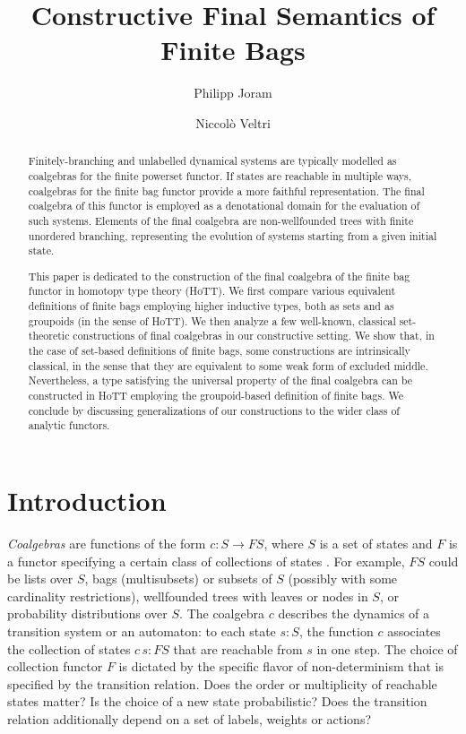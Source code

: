 \documentclass[final,a4paper,USenglish,cleveref]{lipics-v2021}
\title{Constructive Final Semantics of Finite Bags}
\author{Philipp Joram}%
  {Department of Software Science, Tallinn University of Technology, Estonia}
  {philipp@cs.ioc.ee}%
  {https://orcid.org/0000-0002-0448-7907}%
  {}
\author{Niccol{\`o} Veltri}%
  {Department of Software Science, Tallinn University of Technology, Estonia}
  {niccolo@cs.ioc.ee}%
  {https://orcid.org/0000-0002-7230-3436}%
  {}
\begin{document}
\maketitle

\begin{abstract}
  Finitely-branching and unlabelled dynamical systems are typically modelled as coalgebras for the finite powerset functor.
  If states are reachable in multiple ways, coalgebras for the finite bag functor provide a more faithful representation.
  The final coalgebra of this functor is employed as a denotational domain for the evaluation of such systems.
  Elements of the final coalgebra are non-wellfounded trees with finite unordered branching,
  representing the evolution of systems starting from a given initial state.

  This paper is dedicated to the construction of the final coalgebra of the finite bag functor in homotopy type theory (HoTT).
  We first compare various equivalent definitions of finite bags employing higher inductive types, both as sets and as groupoids (in the sense of HoTT).
  We then analyze a few well-known, classical set-theoretic constructions of final coalgebras in our constructive setting.
  We show that, in the case of set-based definitions of finite bags,
  some constructions are intrinsically classical, in the sense that they are equivalent to some weak form of excluded middle.
  Nevertheless, a type satisfying the universal property of the final coalgebra can be constructed in HoTT employing the groupoid-based definition of finite bags.
  We conclude by discussing generalizations of our constructions to the wider class of analytic functors.

\end{abstract}

\setcounter{tocdepth}{2}

\section{Introduction}

\emph{Coalgebras} are functions of the form $c : S \to F S$, where $S$ is a set of states and $F$ is a functor specifying a certain class of collections of states \cite{Rutten2000,Jacobs2016}. For example, $F S$ could be lists over $S$, bags (\ie multisubsets) or subsets of $S$ (possibly with some cardinality restrictions), wellfounded trees with leaves or nodes in $S$, or probability distributions over $S$. The coalgebra $c$ describes the dynamics of a transition system or an automaton: to each state $s : S$, the function $c$ associates the collection of states $c \,s : F S$ that are reachable from $s$ in one step. The choice of collection functor $F$ is dictated by the specific flavor of non-determinism that is specified by the transition relation. Does the order or multiplicity of reachable states matter? Is the choice of a new state probabilistic? Does the transition relation additionally depend on a set of labels, weights or actions?
\end{document}
